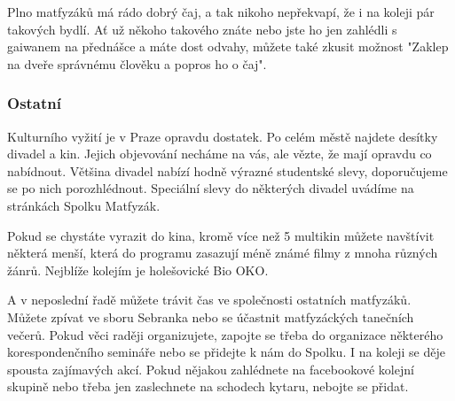 Plno matfyzáků má rádo dobrý čaj, a tak nikoho nepřekvapí, že i na koleji pár
takových bydlí. Ať už někoho takového znáte nebo jste ho jen zahlédli s gaiwanem
na přednášce a máte dost odvahy, můžete také zkusit možnost "Zaklep na dveře
správnému člověku a popros ho o čaj".


\subsubsection{Ostatní}
Kulturního vyžití je v Praze opravdu dostatek. Po celém městě najdete desítky
divadel a kin. Jejich objevování necháme na vás, ale vězte, že mají opravdu co
nabídnout. Většina divadel nabízí hodně výrazné studentské slevy, doporučujeme
se po nich porozhlédnout. Speciální slevy do některých divadel uvádíme na
stránkách Spolku Matfyzák.

Pokud se chystáte vyrazit do kina, kromě více než 5 multikin můžete navštívit
některá menší, která do programu zasazují méně známé filmy z mnoha různých
žánrů. Nejblíže kolejím je holešovické Bio OKO.

A v neposlední řadě můžete trávit čas ve společnosti ostatních matfyzáků. Můžete
zpívat ve sboru Sebranka nebo se účastnit matfyzáckých tanečních večerů. Pokud
věci raději organizujete, zapojte se třeba do organizace některého
korespondenčního semináře nebo se přidejte k nám do Spolku. I na koleji se děje
spousta zajímavých akcí. Pokud nějakou zahlédnete na facebookové kolejní skupině
nebo třeba jen zaslechnete na schodech kytaru, nebojte se přidat.